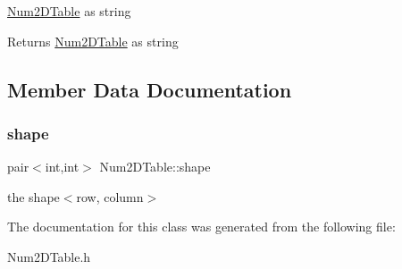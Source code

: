 \mbox{\hyperlink{class_num2_d_table}{Num2\+D\+Table}} as string \begin{DoxyReturn}{Returns}
\mbox{\hyperlink{class_num2_d_table}{Num2\+D\+Table}} as string 
\end{DoxyReturn}


\subsection{Member Data Documentation}
\mbox{\label{class_num2_d_table_a4276fb2f2884e18421c165a22cdf23dc}} 
\subsubsection{\texorpdfstring{shape}{shape}}
{\footnotesize\ttfamily pair$<$int,int$>$ Num2\+D\+Table\+::shape}

the shape$<$row, column$>$ 

The documentation for this class was generated from the following file\+:\begin{DoxyCompactItemize}
\item 
Num2\+D\+Table.\+h\end{DoxyCompactItemize}
